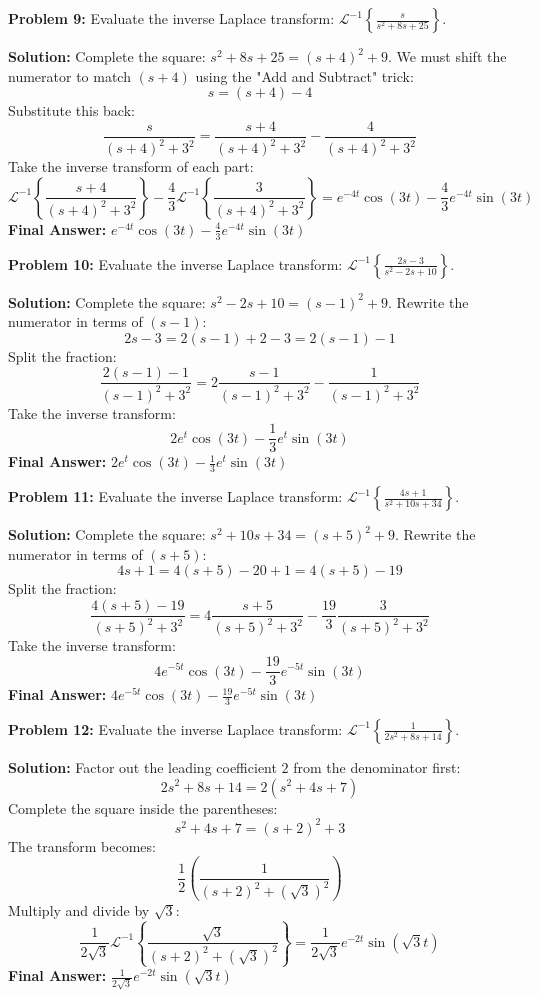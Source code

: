\documentclass[11pt, letterpaper]{article}
\theoremstyle{definition}
\theoremstyle{remark}
\begin{document}
\textbf{Problem 9:} Evaluate the inverse Laplace transform: $\displaystyle \mathcal{L}^{-1} \left\{ \frac{s}{s^2 + 8s + 25} \right\}$.

\textbf{Solution:}
Complete the square: $s^2 + 8s + 25 = (s+4)^2 + 9$.
We must shift the numerator to match $(s+4)$ using the "Add and Subtract" trick:
\[
s = (s+4) - 4
\]
Substitute this back:
\[
\frac{s}{(s+4)^2 + 3^2} = \frac{s+4}{(s+4)^2 + 3^2} - \frac{4}{(s+4)^2 + 3^2}
\]
Take the inverse transform of each part:
\[
\mathcal{L}^{-1} \left\{ \frac{s+4}{(s+4)^2 + 3^2} \right\} - \frac{4}{3} \mathcal{L}^{-1} \left\{ \frac{3}{(s+4)^2 + 3^2} \right\} = e^{-4t}\cos(3t) - \frac{4}{3}e^{-4t}\sin(3t)
\]
\textbf{Final Answer:} $\displaystyle e^{-4t}\cos(3t) - \frac{4}{3}e^{-4t}\sin(3t)$

\vspace{1em}

\textbf{Problem 10:} Evaluate the inverse Laplace transform: $\displaystyle \mathcal{L}^{-1} \left\{ \frac{2s - 3}{s^2 - 2s + 10} \right\}$.

\textbf{Solution:}
Complete the square: $s^2 - 2s + 10 = (s-1)^2 + 9$.
Rewrite the numerator in terms of $(s-1)$:
\[
2s - 3 = 2(s-1) + 2 - 3 = 2(s-1) - 1
\]
Split the fraction:
\[
\frac{2(s-1) - 1}{(s-1)^2 + 3^2} = 2 \frac{s-1}{(s-1)^2 + 3^2} - \frac{1}{(s-1)^2 + 3^2}
\]
Take the inverse transform:
\[
2e^t\cos(3t) - \frac{1}{3}e^t\sin(3t)
\]
\textbf{Final Answer:} $\displaystyle 2e^t\cos(3t) - \frac{1}{3}e^t\sin(3t)$

\vspace{1em}

\textbf{Problem 11:} Evaluate the inverse Laplace transform: $\displaystyle \mathcal{L}^{-1} \left\{ \frac{4s + 1}{s^2 + 10s + 34} \right\}$.

\textbf{Solution:}
Complete the square: $s^2 + 10s + 34 = (s+5)^2 + 9$.
Rewrite the numerator in terms of $(s+5)$:
\[
4s + 1 = 4(s+5) - 20 + 1 = 4(s+5) - 19
\]
Split the fraction:
\[
\frac{4(s+5) - 19}{(s+5)^2 + 3^2} = 4 \frac{s+5}{(s+5)^2 + 3^2} - \frac{19}{3} \frac{3}{(s+5)^2 + 3^2}
\]
Take the inverse transform:
\[
4e^{-5t}\cos(3t) - \frac{19}{3}e^{-5t}\sin(3t)
\]
\textbf{Final Answer:} $\displaystyle 4e^{-5t}\cos(3t) - \frac{19}{3}e^{-5t}\sin(3t)$

\vspace{1em}

\textbf{Problem 12:} Evaluate the inverse Laplace transform: $\displaystyle \mathcal{L}^{-1} \left\{ \frac{1}{2s^2 + 8s + 14} \right\}$.

\textbf{Solution:}
Factor out the leading coefficient $2$ from the denominator first:
\[
2s^2 + 8s + 14 = 2(s^2 + 4s + 7)
\]
Complete the square inside the parentheses:
\[
s^2 + 4s + 7 = (s+2)^2 + 3
\]
The transform becomes:
\[
\frac{1}{2} \left( \frac{1}{(s+2)^2 + (\sqrt{3})^2} \right)
\]
Multiply and divide by $\sqrt{3}$:
\[
\frac{1}{2\sqrt{3}} \mathcal{L}^{-1} \left\{ \frac{\sqrt{3}}{(s+2)^2 + (\sqrt{3})^2} \right\} = \frac{1}{2\sqrt{3}} e^{-2t} \sin(\sqrt{3}t)
\]
\textbf{Final Answer:} $\displaystyle \frac{1}{2\sqrt{3}} e^{-2t} \sin(\sqrt{3}t)$
\end{document}
